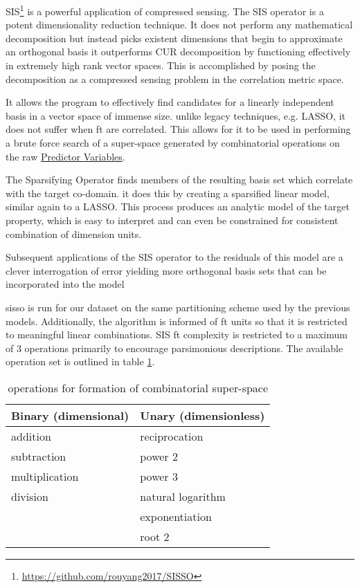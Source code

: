 \documentclass[aip, jmp, amsmath, amssymb, nofootinbib]{revtex4-2}
\begin{document}
SIS\footnote{\url{https://github.com/rouyang2017/SISSO}} is a powerful application of compressed
sensing\cite{ghiringhelli-2017-learn-physic}. The SIS operator is a
potent dimensionality reduction technique. It does not perform any
mathematical decomposition but instead picks existent dimensions that
begin to approximate an orthogonal basis it outperforms
CUR\cite{ray-2021-various-dimen,hamm-2019-cur-decom} decomposition by
functioning effectively in extremely high rank vector spaces. This is
accomplished by posing the decomposition as a compressed sensing
problem in the correlation metric space.

It allows the program to effectively find candidates for a linearly
independent basis in a vector space of immense size. unlike legacy
techniques, e.g. LASSO, it does not suffer when \gls{ft} are
correlated\cite{tibshirani-1996-regres-shrin,gauraha-2018-introd-to-lasso}. This
allows for it to be used in performing a brute force search of a
super-space generated by combinatorial operations on the raw \hyperref[sec:orgff08faf]{Predictor Variables}.

The Sparsifying Operator finds members of the resulting basis set
which correlate with the target co-domain. it does this by creating a
sparsified linear model, similar again to a LASSO. This process
produces an analytic model of the target property, which is easy to
interpret and can even be constrained for consistent combination of
dimension units.

Subsequent applications of the SIS operator to the residuals of this
model are a clever interrogation of error\cite{mayo-1998-error-growt}
yielding more orthogonal basis sets that can be incorporated into the
model

\acrshort{sisso} is run for our dataset on the same partitioning scheme used by
the previous models. Additionally, the algorithm is informed of
\gls{ft} units so that it is restricted to meaningful linear
combinations. SIS \gls{ft} complexity is restricted to a maximum of 3
operations primarily to encourage parsimonious descriptions. The
available operation set is outlined in table \ref{tbl:ops}.

\begin{table}[htbp]
\caption{\label{tbl:ops} operations for formation of combinatorial super-space}
\centering
\begin{tabular}{ll}
Binary (dimensional) & Unary (dimensionless)\\
\hline
addition & reciprocation\\
subtraction & power 2\\
multiplication & power 3\\
division & natural logarithm\\
 & exponentiation\\
 & root 2\\
\end{tabular}
\end{table}
\end{document}
